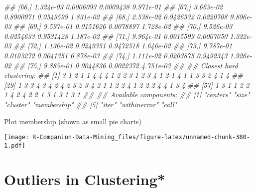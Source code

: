 \documentclass[
  notitlepage]{book}
\newenvironment{Shaded}{\begin{snugshade}}{\end{snugshade}}
\newcommand{\CommentTok}[1]{\textcolor[rgb]{0.56,0.35,0.01}{\textit{#1}}}
\newcommand{\DataTypeTok}[1]{\textcolor[rgb]{0.13,0.29,0.53}{#1}}
\newcommand{\KeywordTok}[1]{\textcolor[rgb]{0.13,0.29,0.53}{\textbf{#1}}}
\newcommand{\NormalTok}[1]{#1}
\newcommand{\OperatorTok}[1]{\textcolor[rgb]{0.81,0.36,0.00}{\textbf{#1}}}
\newcommand{\StringTok}[1]{\textcolor[rgb]{0.31,0.60,0.02}{#1}}
\begin{document}
\begin{Shaded}
\begin{Highlighting}[]
\CommentTok{\#\# [66,] 1.324e{-}03 0.0006093 0.0009438 9.971e{-}01}
\CommentTok{\#\# [67,] 3.663e{-}02 0.8900971 0.0549599 1.831e{-}02}
\CommentTok{\#\# [68,] 2.538e{-}02 0.9426532 0.0220708 9.896e{-}03}
\CommentTok{\#\# [69,] 9.597e{-}01 0.0151626 0.0078897 1.728e{-}02}
\CommentTok{\#\# [70,] 9.526e{-}03 0.0254633 0.9531428 1.187e{-}02}
\CommentTok{\#\# [71,] 9.964e{-}01 0.0015599 0.0007050 1.322e{-}03}
\CommentTok{\#\# [72,] 1.136e{-}02 0.0249351 0.9472518 1.646e{-}02}
\CommentTok{\#\# [73,] 9.787e{-}01 0.0103272 0.0041351 6.878e{-}03}
\CommentTok{\#\# [74,] 1.111e{-}02 0.0203875 0.9492343 1.926e{-}02}
\CommentTok{\#\# [75,] 9.885e{-}01 0.0044836 0.0022372 4.751e{-}03}
\CommentTok{\#\# }
\CommentTok{\#\# Closest hard clustering:}
\CommentTok{\#\#  [1] 3 1 2 1 1 4 4 4 1 2 2 3 1 2 3 4 1 2 1 4 1 1 3 3 2 4 1 4}
\CommentTok{\#\# [29] 1 3 3 4 3 4 2 4 2 3 2 3 4 2 1 1 2 2 4 1 2 2 2 4 4 1 3 4}
\CommentTok{\#\# [57] 1 3 1 1 2 2 1 4 2 4 2 2 1 3 1 3 1 3 1}
\CommentTok{\#\# }
\CommentTok{\#\# Available components:}
\CommentTok{\#\# [1] "centers"     "size"        "cluster"     "membership" }
\CommentTok{\#\# [5] "iter"        "withinerror" "call"}
\end{Highlighting}
\end{Shaded}

Plot membership (shown as small pie charts)

\begin{Shaded}
\end{Shaded}

\texttt{[image: R-Companion-Data-Mining\_files/figure-latex/unnamed-chunk-380-1.pdf]}

\hypertarget{outliers-in-clustering}{%
\section{Outliers in Clustering*}\label{outliers-in-clustering}}
\end{document}
